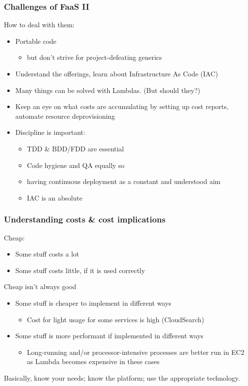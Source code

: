 \documentclass{beamer}
\begin{document}
\begin{frame}
\frametitle{Challenges of FaaS II}
How to deal with them:
\begin{itemize}
  \item Portable code 
  \begin{itemize}
	\item   but don't strive for project-defeating generics
  \end{itemize}  
  \item Understand the offerings, learn about Infrastructure As Code (IAC)
  \item Many things can be solved with Lambdas. (But should they?) 
  \item Keep an eye on what costs are accumulating by setting up cost reports, automate resource deprovisioning
  \item Discipline is important: 
  \begin{itemize}
    \item TDD \& BDD/FDD are essential
    \item Code hygiene and QA equally so
    \item having continuous deployment as a constant and understood aim
    \item IAC is an absolute
  \end{itemize}
\end{itemize}
\end{frame}

\begin{frame}
\frametitle{Understanding costs \& cost implications}
Cheap:
\begin{itemize}
  \item Some stuff costs a lot
  \item Some stuff costs little, if it is used correctly
\end{itemize}
Cheap isn't always good
\begin{itemize}
  \item Some stuff is cheaper to implement in different ways
  \begin{itemize}
    \item Cost for light usage for some services is high (CloudSearch)
  \end{itemize}
  \item Some stuff is more performant if implemented in different ways
  \begin{itemize}
    \item Long-running and/or processor-intensive processes are better run in EC2 as Lambda becomes expensive in these cases
  \end{itemize}
\end{itemize}
Basically, know your needs; know the platform; use the appropriate technology.

\end{frame}
\end{document}
